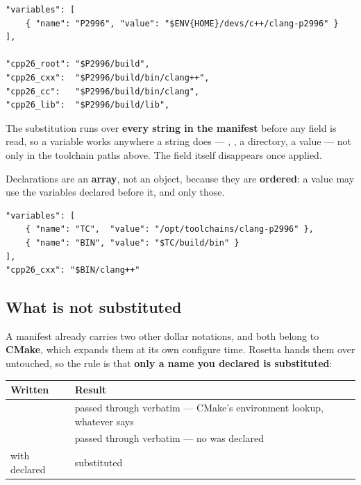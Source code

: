 \begin{lstlisting}[style=json]
"variables": [
    { "name": "P2996", "value": "$ENV{HOME}/devs/c++/clang-p2996" }
],

"cpp26_root": "$P2996/build",
"cpp26_cxx":  "$P2996/build/bin/clang++",
"cpp26_cc":   "$P2996/build/bin/clang",
"cpp26_lib":  "$P2996/build/lib",
\end{lstlisting}

The substitution runs over \textbf{every string in the manifest} before any
field is read, so a variable works anywhere a string does ---
, , a  directory, a
 value --- not only in the toolchain paths above.
The field itself disappears once applied.

Declarations are an \textbf{array}, not an object, because they are
\textbf{ordered}: a value may use the variables declared before it, and only
those.

\begin{lstlisting}[style=json]
"variables": [
    { "name": "TC",  "value": "/opt/toolchains/clang-p2996" },
    { "name": "BIN", "value": "$TC/build/bin" }
],
"cpp26_cxx": "$BIN/clang++"
\end{lstlisting}

\subsection{What is not substituted}

A manifest already carries two other dollar notations, and both belong to
\textbf{CMake}, which expands them at its own configure time. Rosetta hands
them over untouched, so the rule is that \textbf{only a name you declared is
substituted}:

\begin{center}
\small
\begin{tabular}{@{}lL{8.4cm}@{}}
\toprule
\textbf{Written} & \textbf{Result} \\
\midrule
{} & passed through verbatim --- CMake's environment lookup,
  whatever  says \\
 & passed through verbatim --- no
   was declared \\
 with  declared & substituted \\
\bottomrule
\end{tabular}
\end{center}

